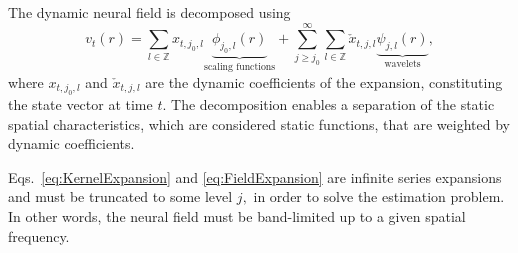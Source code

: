 \documentclass[review,authoryear,3p]{elsarticle}
\begin{document}
The dynamic neural field is decomposed using
\begin{equation}
 v_t\left(r\right)=\sum_{l \in \mathbb{Z}}x_{t,j_{0},l} \underbrace{\phi_{j_0,l}\left(r\right)}_{\text{scaling functions}} + \sum_{j\geq j_0}^{\infty} \sum_{l \in \mathbb{Z}} \check{x}_{t,j,l} \underbrace{\psi_{j,l}\left(r\right)}_{\text{wavelets}},
\label{eq:FieldExpansion}
\end{equation}
where $x_{t,j_{0},l}$ and $\check{x}_{t,j,l} $ are the dynamic coefficients of the expansion, constituting the state vector at time $t$. The decomposition enables a separation of the static spatial characteristics, which are considered static functions, that are weighted by dynamic coefficients.

Eqs.~\eqref{eq:KernelExpansion} and \eqref{eq:FieldExpansion} are infinite series expansions and must be truncated to some level $j,$ in order to solve the estimation problem. In other words, the neural field must be band-limited up to a given spatial frequency. 
\end{document}
